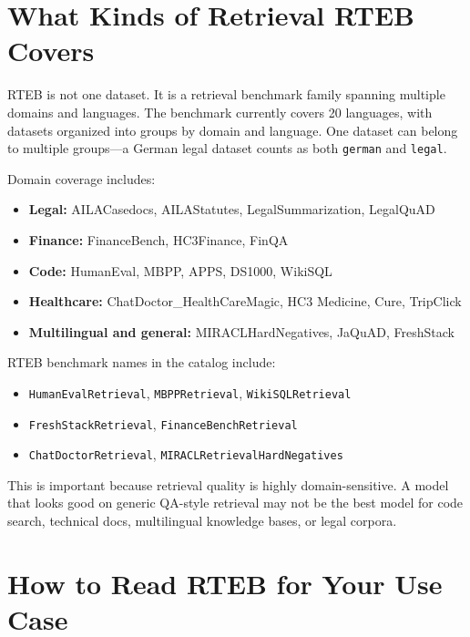 \section{What Kinds of Retrieval RTEB Covers}

RTEB is not one dataset. It is a retrieval benchmark family spanning multiple domains and
languages. The benchmark currently covers 20 languages, with datasets organized into groups
by domain and language. One dataset can belong to multiple groups---a German legal dataset
counts as both \texttt{german} and \texttt{legal}.

Domain coverage includes:

\begin{itemize}
    \item \textbf{Legal:} AILACasedocs, AILAStatutes, LegalSummarization, LegalQuAD
    \item \textbf{Finance:} FinanceBench, HC3Finance, FinQA
    \item \textbf{Code:} HumanEval, MBPP, APPS, DS1000, WikiSQL
    \item \textbf{Healthcare:} ChatDoctor\_HealthCareMagic, HC3 Medicine, Cure, TripClick
    \item \textbf{Multilingual and general:} MIRACLHardNegatives, JaQuAD, FreshStack
\end{itemize}

RTEB benchmark names in the catalog include:

\begin{itemize}
    \item \texttt{HumanEvalRetrieval}, \texttt{MBPPRetrieval}, \texttt{WikiSQLRetrieval}
    \item \texttt{FreshStackRetrieval}, \texttt{FinanceBenchRetrieval}
    \item \texttt{ChatDoctorRetrieval}, \texttt{MIRACLRetrievalHardNegatives}
\end{itemize}

This is important because retrieval quality is highly domain-sensitive. A model that looks
good on generic QA-style retrieval may not be the best model for code search, technical docs,
multilingual knowledge bases, or legal corpora.

\section{How to Read RTEB for Your Use Case}


